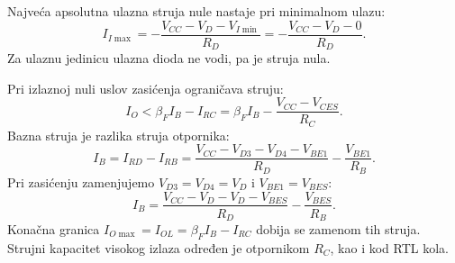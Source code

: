 Najveća apsolutna ulazna struja nule nastaje pri minimalnom ulazu:
\[I_{I\max}=-\frac{V_{CC}-V_D-V_{I\min}}{R_D}=-\frac{V_{CC}-V_D-0}{R_D}.\]
Za ulaznu jedinicu ulazna dioda ne vodi, pa je struja nula.

Pri izlaznoj nuli uslov zasićenja ograničava struju:
\[I_O<\beta_FI_B-I_{RC}=\beta_FI_B-\frac{V_{CC}-V_{CES}}{R_C}.\]
Bazna struja je razlika struja otpornika:
\[I_B=I_{RD}-I_{RB}=\frac{V_{CC}-V_{D3}-V_{D4}-V_{BE1}}{R_D}-\frac{V_{BE1}}{R_B}.\]
Pri zasićenju zamenjujemo $V_{D3}=V_{D4}=V_D$ i $V_{BE1}=V_{BES}$:
\[I_B=\frac{V_{CC}-V_D-V_D-V_{BES}}{R_D}-\frac{V_{BES}}{R_B}.\]
Konačna granica $I_{O\max}=I_{OL}=\beta_FI_B-I_{RC}$ dobija se zamenom tih struja. Strujni kapacitet visokog izlaza određen je otpornikom $R_C$, kao i kod RTL kola.
